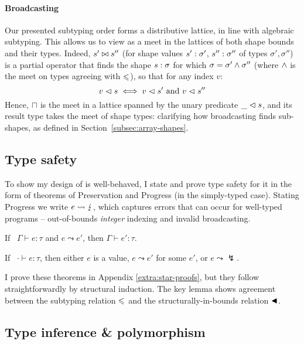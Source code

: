 \paragraph{Broadcasting}
Our presented subtyping order forms a distributive lattice, in line with algebraic subtyping. 
This allows us to view as a meet in the lattices of both shape bounds and their types. 
Indeed, $s' \bowtie s''$ (for shape values $s': \sigma'$, $s'' : \sigma''$ of types $\sigma', \sigma''$) is a partial operator that finds the shape $s : \sigma$ for which $\sigma = \sigma' \land \sigma''$ (where $\land$ is the meet on types agreeing with $\leqslant$), so that for any index $v$: 
$$ v \vartriangleleft s \iff v \vartriangleleft s' \text{ and } v \vartriangleleft s'' $$
Hence, $\sqcap$ is the meet in a lattice spanned by the unary predicate $\_ \vartriangleleft s$, and its result type takes the meet of shape types: clarifying how broadcasting finds sub-shapes, as defined in Section~\ref{subsec:array-shapes}.

\subsection{Type safety}
\label{subsec:type-safety}

To show my design of \starr{} is well-behaved, I state and prove type safety for it in the form of theorems of Preservation and Progress (in the simply-typed case). Stating Progress we write $e \leadsto \lightning$, which captures errors that can occur for well-typed programs -- out-of-bounds \emph{integer} indexing and invalid broadcasting.

\begin{theorem}[Preservation]
    If \ $\Gamma \vdash e : \tau$ and $e \leadsto e'$, then $\Gamma \vdash e' : \tau$.
\end{theorem}
\begin{theorem}[Progress]
    If \ $\cdot \vdash e : \tau$, then either $e$ is a value, $e \leadsto e'$ for some $e'$, or $e \leadsto \lightning$.
\end{theorem}

I prove these theorems in Appendix \ref{extra:star-proofs}, but they follow straightforwardly by structural induction. The key lemma shows agreement between the subtyping relation $\leqslant$ and the structurally-in-bounds relation $\blacktriangleleft$.


\subsection{Type inference \& polymorphism}
\label{subsec:type-inference}

